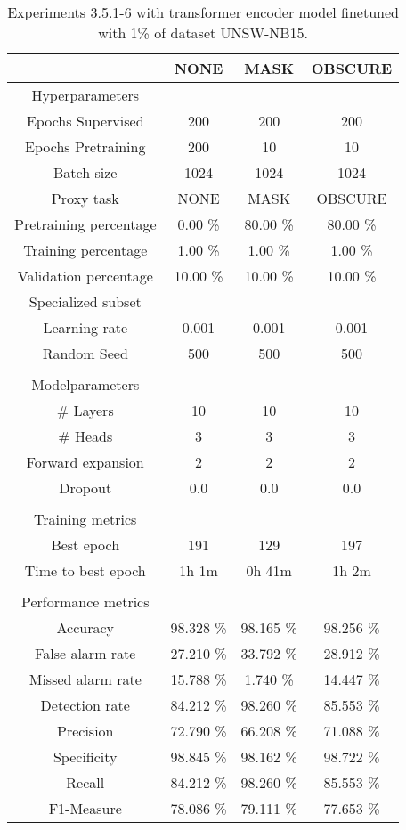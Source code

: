 \begin{table}[htb]
    \centering
    \begin{tabular}{@{}cccc@{}}
        \toprule
         &  NONE &  MASK &  OBSCURE \\
        \midrule
        Hyperparameters &  &  &  \\
        Epochs Supervised &  200 &  200 &  200 \\
        Epochs Pretraining &  200 &  10 &  10 \\
        Batch size &  1024 &  1024 &  1024 \\
        Proxy task &  NONE &  MASK &  OBSCURE \\
        Pretraining percentage &  0.00 \% &  80.00 \% &  80.00 \% \\
        Training percentage &  1.00 \% &  1.00 \% &  1.00 \% \\
        Validation percentage &  10.00 \% &  10.00 \% &  10.00 \% \\
        Specialized subset &   &   &   \\
        Learning rate &  0.001 &  0.001 &  0.001 \\
        Random Seed &  500 &  500 &  500 \\
         \\
        Modelparameters &  &  &  \\
        \# Layers &  10 &  10 &  10 \\
        \# Heads &  3 &  3 &  3 \\
        Forward expansion &  2 &  2 &  2 \\
        Dropout &  0.0 &  0.0 &  0.0 \\
         \\
        Training metrics &  &  &  \\
        Best epoch &  191 &  129 &  197 \\
        Time to best epoch &  1h 1m &  0h 41m &  1h 2m \\
         \\
        Performance metrics &  &  &  \\
        Accuracy &  98.328 \% &  98.165 \% &  98.256 \% \\
        False alarm rate &  27.210 \% &  33.792 \% &  28.912 \% \\
        Missed alarm rate &  15.788 \% &  1.740 \% &  14.447 \% \\
        Detection rate &  84.212 \% &  98.260 \% &  85.553 \% \\
        Precision &  72.790 \% &  66.208 \% &  71.088 \% \\
        Specificity &  98.845 \% &  98.162 \% &  98.722 \% \\
        Recall &  84.212 \% &  98.260 \% &  85.553 \% \\
        F1-Measure &  78.086 \% &  79.111 \% &  77.653 \% \\
        \bottomrule
    \end{tabular}
    \caption{Experiments 3.5.1-6 with transformer encoder model finetuned with 1\% of dataset UNSW-NB15.}
    \label{table:results:lstm:stats_flows15_10}
\end{table}